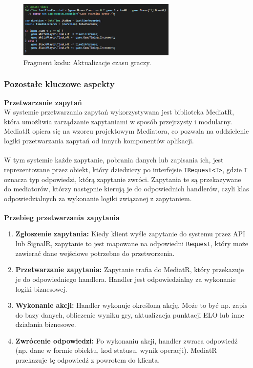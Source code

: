 \documentclass[twoside]{projektInzynierskiMS1}
\begin{document}
\vspace{0.5cm}
\begin{figure}[h!]
    \centering
    \includegraphics[width=0.7\textwidth]{images/ex_update_times.png}
    \caption{Fragment kodu: Aktualizacje czasu graczy.}
\end{figure}
\vspace{0.5cm}

\newpage

\subsubsection{Pozostałe kluczowe aspekty}

\noindent \textbf{Przetwarzanie zapytań}\\
W systemie przetwarzania zapytań wykorzystywana jest biblioteka MediatR, która umożliwia zarządzanie zapytaniami w sposób przejrzysty i modularny. MediatR opiera się na wzorcu projektowym Mediatora, co pozwala na oddzielenie logiki przetwarzania zapytań od innych komponentów aplikacji.
\\\\
W tym systemie każde zapytanie, pobrania danych lub zapisania ich, jest reprezentowane przez obiekt, który dziedziczy po interfejsie \texttt{IRequest<T>}, gdzie \texttt{T} oznacza typ odpowiedzi, którą zapytanie zwróci. Zapytania te są przekazywane do mediatorów, którzy następnie kierują je do odpowiednich handlerów, czyli klas odpowiedzialnych za wykonanie logiki związanej z zapytaniem.
\\\\

\noindent \textbf{Przebieg przetwarzania zapytania}
\begin{enumerate}
    \item \textbf{Zgłoszenie zapytania:} Kiedy klient wyśle zapytanie do systemu przez API lub SignalR, zapytanie to jest mapowane na odpowiedni \texttt{Request}, który może zawierać dane wejściowe potrzebne do przetworzenia.
    \item \textbf{Przetwarzanie zapytania:} Zapytanie trafia do MediatR, który przekazuje je do odpowiedniego handlera. Handler jest odpowiedzialny za wykonanie logiki biznesowej.
    \item \textbf{Wykonanie akcji:} Handler wykonuje określoną akcję. Może to być np. zapis do bazy danych, obliczenie wyniku gry, aktualizacja punktacji ELO lub inne działania biznesowe.
    \item \textbf{Zwrócenie odpowiedzi:} Po wykonaniu akcji, handler zwraca odpowiedź (np. dane w formie obiektu, kod statusu, wynik operacji). MediatR przekazuje tę odpowiedź z powrotem do klienta.
\end{enumerate}
\end{document}
